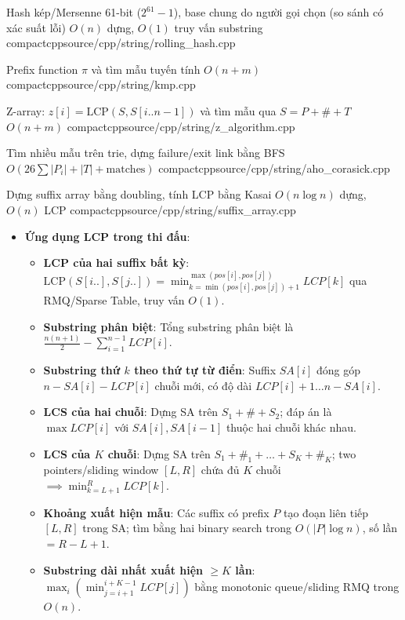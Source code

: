 {Hash kép/Mersenne 61-bit ($2^{61}-1$), base chung do người gọi chọn (so sánh có xác suất lỗi)}
{$O(n)$ dựng, $O(1)$ truy vấn substring}
{compactcpp}{source/cpp/string/rolling_hash.cpp}

{Prefix function $\pi$ và tìm mẫu tuyến tính}
{$O(n + m)$}
{compactcpp}{source/cpp/string/kmp.cpp}

{Z-array: $z[i] = \text{LCP}(S, S[i..n-1])$ và tìm mẫu qua $S = P + \# + T$}
{$O(n + m)$}
{compactcpp}{source/cpp/string/z_algorithm.cpp}

{Tìm nhiều mẫu trên trie, dựng failure/exit link bằng BFS}
{$O(26\sum |P_i| + |T| + \text{matches})$}
{compactcpp}{source/cpp/string/aho_corasick.cpp}

{Dựng suffix array bằng doubling, tính LCP bằng Kasai}
{$O(n \log n)$ dựng, $O(n)$ LCP}
{compactcpp}{source/cpp/string/suffix_array.cpp}

\begin{itemize}
    \item \textbf{Ứng dụng LCP trong thi đấu}:
    \begin{itemize}
        \item \textbf{LCP của hai suffix bất kỳ}: $\text{LCP}(S[i..], S[j..]) = \min_{k=\min(pos[i], pos[j])+1}^{\max(pos[i], pos[j])} LCP[k]$ qua RMQ/Sparse Table, truy vấn $O(1)$.
        \item \textbf{Substring phân biệt}: Tổng substring phân biệt là $\frac{n(n+1)}{2} - \sum_{i=1}^{n-1} LCP[i]$.
        \item \textbf{Substring thứ $k$ theo thứ tự từ điển}: Suffix $SA[i]$ đóng góp $n - SA[i] - LCP[i]$ chuỗi mới, có độ dài $LCP[i]+1 \dots n - SA[i]$.
        \item \textbf{LCS của hai chuỗi}: Dựng SA trên $S_1 + \# + S_2$; đáp án là $\max LCP[i]$ với $SA[i], SA[i-1]$ thuộc hai chuỗi khác nhau.
        \item \textbf{LCS của $K$ chuỗi}: Dựng SA trên $S_1 + \#_1 + \dots + S_K + \#_K$; two pointers/sliding window $[L, R]$ chứa đủ $K$ chuỗi $\implies \min_{k=L+1}^R LCP[k]$.
        \item \textbf{Khoảng xuất hiện mẫu}: Các suffix có prefix $P$ tạo đoạn liên tiếp $[L, R]$ trong SA; tìm bằng hai binary search trong $O(|P| \log n)$, số lần $= R - L + 1$.
        \item \textbf{Substring dài nhất xuất hiện $\ge K$ lần}: $\max_i (\min_{j=i+1}^{i+K-1} LCP[j])$ bằng monotonic queue/sliding RMQ trong $O(n)$.
    \end{itemize}
\end{itemize}


